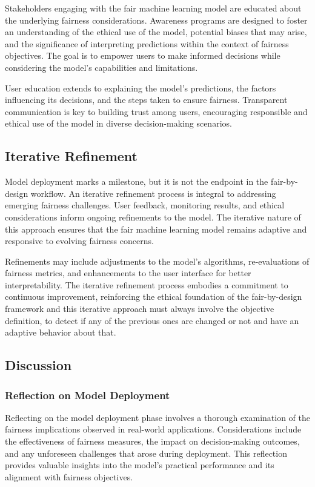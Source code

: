 \documentclass[12pt,a4paper,openright,twoside]{book}
\begin{document}
Stakeholders engaging with the fair machine learning model are educated about the underlying fairness considerations. Awareness programs are designed to foster an understanding of the ethical use of the model, potential biases that may arise, and the significance of interpreting predictions within the context of fairness objectives. The goal is to empower users to make informed decisions while considering the model's capabilities and limitations.

User education extends to explaining the model's predictions, the factors influencing its decisions, and the steps taken to ensure fairness. Transparent communication is key to building trust among users, encouraging responsible and ethical use of the model in diverse decision-making scenarios.

\subsection{Iterative Refinement}

Model deployment marks a milestone, but it is not the endpoint in the fair-by-design workflow. An iterative refinement process is integral to addressing emerging fairness challenges. User feedback, monitoring results, and ethical considerations inform ongoing refinements to the model. The iterative nature of this approach ensures that the fair machine learning model remains adaptive and responsive to evolving fairness concerns.

Refinements may include adjustments to the model's algorithms, re-evaluations of fairness metrics, and enhancements to the user interface for better interpretability. The iterative refinement process embodies a commitment to continuous improvement, reinforcing the ethical foundation of the fair-by-design framework and this iterative approach must always involve the objective definition, to detect if any of the previous ones are changed or not and have an adaptive behavior about that.

\subsection{Discussion}

\subsubsection{Reflection on Model Deployment}

Reflecting on the model deployment phase involves a thorough examination of the fairness implications observed in real-world applications. Considerations include the effectiveness of fairness measures, the impact on decision-making outcomes, and any unforeseen challenges that arose during deployment. This reflection provides valuable insights into the model's practical performance and its alignment with fairness objectives.
\end{document}
